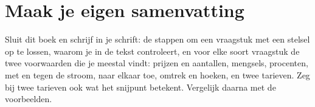 
\ifzelfstudie
\section*{Maak je eigen samenvatting}
Sluit dit boek en schrijf in je schrift: de stappen om een vraagstuk met een stelsel op te lossen, waarom je in de tekst controleert, en voor elke soort vraagstuk de twee voorwaarden die je meestal vindt: prijzen en aantallen, mengsels, procenten, met en tegen de stroom, naar elkaar toe, omtrek en hoeken, en twee tarieven. Zeg bij twee tarieven ook wat het snijpunt betekent. Vergelijk daarna met de voorbeelden.
\fi
